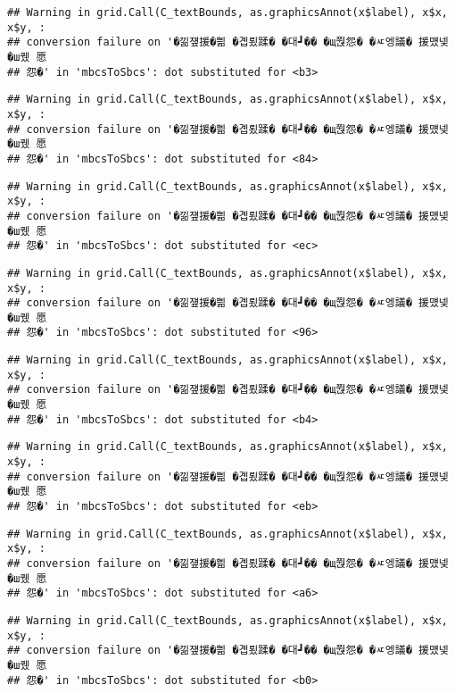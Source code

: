 \documentclass[
]{article}
\begin{document}
\begin{verbatim}
## Warning in grid.Call(C_textBounds, as.graphicsAnnot(x$label), x$x, x$y, :
## conversion failure on '�낆쟾援�쁾 �곕룄蹂� �대┛�� �щ쭩怨� �ㅼ엥議� 援먰넻�ш퀬 愿
## 怨�' in 'mbcsToSbcs': dot substituted for <b3>
\end{verbatim}

\begin{verbatim}
## Warning in grid.Call(C_textBounds, as.graphicsAnnot(x$label), x$x, x$y, :
## conversion failure on '�낆쟾援�쁾 �곕룄蹂� �대┛�� �щ쭩怨� �ㅼ엥議� 援먰넻�ш퀬 愿
## 怨�' in 'mbcsToSbcs': dot substituted for <84>
\end{verbatim}

\begin{verbatim}
## Warning in grid.Call(C_textBounds, as.graphicsAnnot(x$label), x$x, x$y, :
## conversion failure on '�낆쟾援�쁾 �곕룄蹂� �대┛�� �щ쭩怨� �ㅼ엥議� 援먰넻�ш퀬 愿
## 怨�' in 'mbcsToSbcs': dot substituted for <ec>
\end{verbatim}

\begin{verbatim}
## Warning in grid.Call(C_textBounds, as.graphicsAnnot(x$label), x$x, x$y, :
## conversion failure on '�낆쟾援�쁾 �곕룄蹂� �대┛�� �щ쭩怨� �ㅼ엥議� 援먰넻�ш퀬 愿
## 怨�' in 'mbcsToSbcs': dot substituted for <96>
\end{verbatim}

\begin{verbatim}
## Warning in grid.Call(C_textBounds, as.graphicsAnnot(x$label), x$x, x$y, :
## conversion failure on '�낆쟾援�쁾 �곕룄蹂� �대┛�� �щ쭩怨� �ㅼ엥議� 援먰넻�ш퀬 愿
## 怨�' in 'mbcsToSbcs': dot substituted for <b4>
\end{verbatim}

\begin{verbatim}
## Warning in grid.Call(C_textBounds, as.graphicsAnnot(x$label), x$x, x$y, :
## conversion failure on '�낆쟾援�쁾 �곕룄蹂� �대┛�� �щ쭩怨� �ㅼ엥議� 援먰넻�ш퀬 愿
## 怨�' in 'mbcsToSbcs': dot substituted for <eb>
\end{verbatim}

\begin{verbatim}
## Warning in grid.Call(C_textBounds, as.graphicsAnnot(x$label), x$x, x$y, :
## conversion failure on '�낆쟾援�쁾 �곕룄蹂� �대┛�� �щ쭩怨� �ㅼ엥議� 援먰넻�ш퀬 愿
## 怨�' in 'mbcsToSbcs': dot substituted for <a6>
\end{verbatim}

\begin{verbatim}
## Warning in grid.Call(C_textBounds, as.graphicsAnnot(x$label), x$x, x$y, :
## conversion failure on '�낆쟾援�쁾 �곕룄蹂� �대┛�� �щ쭩怨� �ㅼ엥議� 援먰넻�ш퀬 愿
## 怨�' in 'mbcsToSbcs': dot substituted for <b0>
\end{verbatim}
\end{document}
